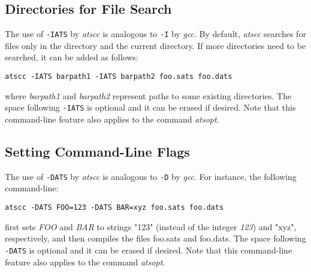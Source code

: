 \subsection{Directories for File Search}
The use of \verb`-IATS` by {\it atscc} is analogous to \verb`-I` by {\it gcc}.
By default, {\it atscc} searches for files only in the directory {\ATSHOME}
and the current directory. If more directories need to be searched, it can
be added as follows:
\begin{verbatim}
atscc -IATS barpath1 -IATS barpath2 foo.sats foo.dats
\end{verbatim}
where {\it barpath1} and {\it barpath2} represent paths to some existing
directories.  The space following \verb`-IATS` is optional and it can be
erased if desired. Note that this command-line feature also applies to the
command {\it atsopt}.

\subsection{Setting Command-Line Flags}
The use of \verb`-DATS` by {\it atscc} is analogous to \verb`-D` by {\it gcc}.
For instance, the following command-line:
\begin{verbatim}
atscc -DATS FOO=123 -DATS BAR=xyz foo.sats foo.dats
\end{verbatim}
first sets {\it FOO} and {\it BAR} to strings "123" (instead of the integer
{\it 123}) and "xyz", respectively, and then compiles the files foo.sats
and foo.dats.  The space following \verb`-DATS` is optional and it can be
erased if desired.  Note that this command-line feature also applies to the
command {\it atsopt}.

